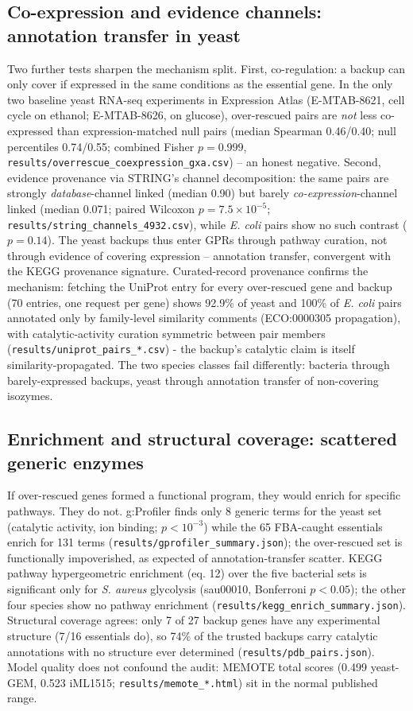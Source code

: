 \documentclass[12pt]{article}
\begin{document}
\subsection{Co-expression and evidence channels: annotation transfer in yeast}
Two further tests sharpen the mechanism split. First, co-regulation: a
backup can only cover if expressed in the same conditions as the
essential gene. In the only two baseline yeast RNA-seq experiments in
Expression Atlas (E-MTAB-8621, cell cycle on ethanol; E-MTAB-8626, on
glucose), over-rescued pairs are \emph{not} less co-expressed than
expression-matched null pairs (median Spearman 0.46/0.40; null
percentiles 0.74/0.55; combined Fisher $p=0.999$,
\texttt{results/overrescue\_coexpression\_gxa.csv}) -- an honest
negative. Second, evidence provenance via STRING's channel
decomposition: the same pairs are strongly \emph{database}-channel
linked (median 0.90) but barely \emph{co-expression}-channel linked
(median 0.071; paired Wilcoxon $p=7.5\times10^{-5}$;
\texttt{results/string\_channels\_4932.csv}), while \emph{E. coli}
pairs show no such contrast ($p=0.14$). The yeast backups thus enter
GPRs through pathway curation, not through evidence of covering
expression -- annotation transfer, convergent with the KEGG provenance
signature. Curated-record provenance confirms the mechanism: fetching the
UniProt entry for every over-rescued gene and backup (70 entries, one
request per gene) shows 92.9\% of yeast and 100\% of \emph{E. coli}
pairs annotated only by family-level similarity comments
(ECO:0000305 propagation), with catalytic-activity curation symmetric
between pair members (\texttt{results/uniprot\_pairs\_*.csv}) - the
backup's catalytic claim is itself similarity-propagated. The two species classes fail differently: bacteria through
barely-expressed backups, yeast through annotation transfer of
non-covering isozymes.


\subsection{Enrichment and structural coverage: scattered generic enzymes}
If over-rescued genes formed a functional program, they would enrich for
specific pathways. They do not. g:Profiler finds only 8 generic terms
for the yeast set (catalytic activity, ion binding; $p<10^{-3}$) while
the 65 FBA-caught essentials enrich for 131 terms
(\texttt{results/gprofiler\_summary.json}); the over-rescued set is
functionally impoverished, as expected of annotation-transfer scatter.
KEGG pathway hypergeometric enrichment (eq. 12) over the five bacterial
sets is significant only for \emph{S. aureus} glycolysis
(sau00010, Bonferroni $p<0.05$); the other four species show no pathway
enrichment (\texttt{results/kegg\_enrich\_summary.json}). Structural
coverage agrees: only 7 of 27 backup genes have any experimental
structure (7/16 essentials do), so 74\% of the trusted backups carry
catalytic annotations with no structure ever determined
(\texttt{results/pdb\_pairs.json}). Model quality does not confound the
audit: MEMOTE total scores (0.499 yeast-GEM, 0.523 iML1515;
\texttt{results/memote\_*.html}) sit in the normal published range.
\end{document}
